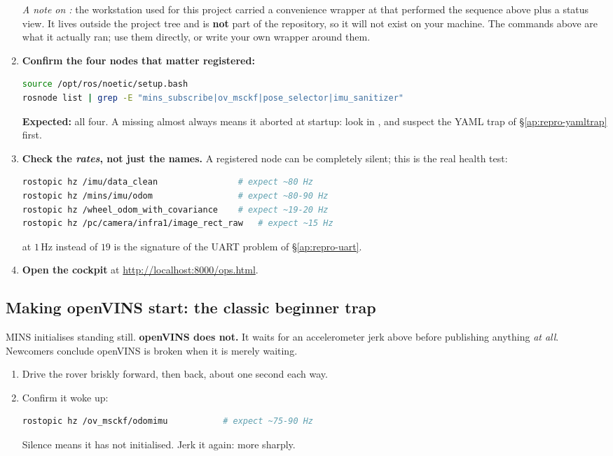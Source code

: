 \begin{enumerate}[leftmargin=1.4em]
  \emph{A note on :} the workstation used for this project
  carried a convenience wrapper at  that
  performed the sequence above plus a status view. It lives outside the
  project tree and is \textbf{not} part of the repository, so it will not
  exist on your machine. The commands above are what it actually ran; use
  them directly, or write your own wrapper around them.
\item \textbf{Confirm the four nodes that matter registered:}
\begin{lstlisting}[language=bash]
source /opt/ros/noetic/setup.bash
rosnode list | grep -E "mins_subscribe|ov_msckf|pose_selector|imu_sanitizer"
\end{lstlisting}
  \textbf{Expected:} all four. A missing  almost always means
  it aborted at startup: look in , and
  suspect the YAML trap of \S\ref{ap:repro-yamltrap} first.
\item \textbf{Check the \emph{rates}, not just the names.} A registered node
  can be completely silent; this is the real health test:
\begin{lstlisting}[language=bash]
rostopic hz /imu/data_clean                # expect ~80 Hz
rostopic hz /mins/imu/odom                 # expect ~80-90 Hz
rostopic hz /wheel_odom_with_covariance    # expect ~19-20 Hz
rostopic hz /pc/camera/infra1/image_rect_raw   # expect ~15 Hz
\end{lstlisting}
   at $1$\,Hz instead of $19$ is the
  signature of the UART problem of \S\ref{ap:repro-uart}.
\item \textbf{Open the cockpit} at \url{http://localhost:8000/ops.html}.
\end{enumerate}

\subsection{Making openVINS start: the classic beginner trap}
MINS initialises standing still. \textbf{openVINS does not.} It waits for an
accelerometer jerk above  before publishing anything
\emph{at all}. Newcomers conclude openVINS is broken when it is merely waiting.

\begin{enumerate}[leftmargin=1.4em]
\item Drive the rover briskly forward, then back, about one second each way.
\item Confirm it woke up:
\begin{lstlisting}[language=bash]
rostopic hz /ov_msckf/odomimu           # expect ~75-90 Hz
\end{lstlisting}
  Silence means it has not initialised. Jerk it again: more sharply.
\end{enumerate}

